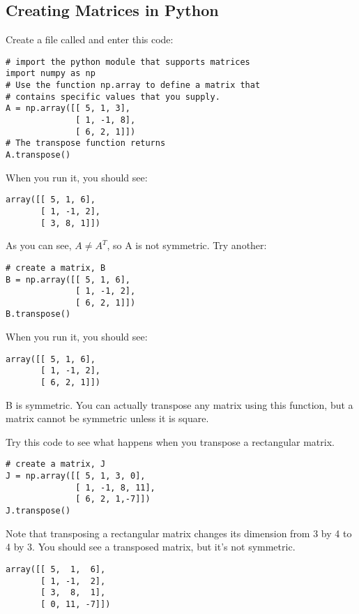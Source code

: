 \subsection{Creating Matrices in Python}
Create a file called  and enter this code:
\begin{Verbatim}
# import the python module that supports matrices
import numpy as np
# Use the function np.array to define a matrix that 
# contains specific values that you supply.
A = np.array([[ 5, 1, 3], 
              [ 1, -1, 8], 
              [ 6, 2, 1]])
# The transpose function returns 
A.transpose()
\end{Verbatim}
When you run it, you should see:
\begin{Verbatim}
array([[ 5, 1, 6], 
       [ 1, -1, 2], 
       [ 3, 8, 1]])
\end{Verbatim}
As you can see, $A\neq A^T$, so A is not symmetric.
Try another: 
\begin{Verbatim}
# create a matrix, B
B = np.array([[ 5, 1, 6], 
              [ 1, -1, 2], 
              [ 6, 2, 1]])
B.transpose()
\end{Verbatim}
When you run it, you should see:
\begin{Verbatim}
array([[ 5, 1, 6], 
       [ 1, -1, 2], 
       [ 6, 2, 1]])
\end{Verbatim}
B is symmetric. You can actually transpose any matrix using this function, but a matrix cannot be symmetric unless it is square. 

Try this code to see what happens when you transpose a rectangular matrix. 
\begin{Verbatim}
# create a matrix, J
J = np.array([[ 5, 1, 3, 0], 
              [ 1, -1, 8, 11], 
              [ 6, 2, 1,-7]])
J.transpose()
\end{Verbatim}
Note that transposing a rectangular matrix changes its dimension from 3 by 4 to 4 by 3. You should see a transposed matrix, but it's not symmetric.
\begin{Verbatim}
array([[ 5,  1,  6],
       [ 1, -1,  2],
       [ 3,  8,  1],
       [ 0, 11, -7]])
\end{Verbatim}


